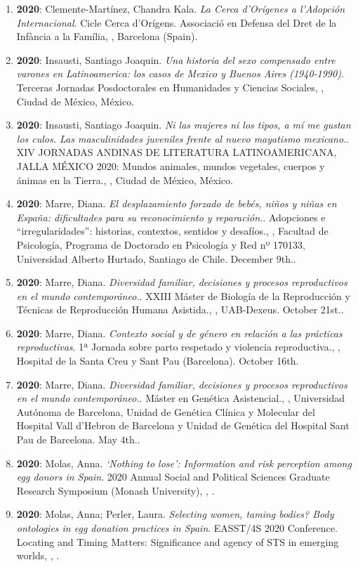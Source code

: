 \begin{enumerate}
\item {\bf 2020}: Clemente-Martínez, Chandra Kala. {\it La Cerca d’Orígenes a l’Adopción Internacional}. Cicle Cerca d’Orígens. Associació en Defensa del Dret de la Infància a la Família, , Barcelona (Spain).\filbreak
\item {\bf 2020}: Insausti, Santiago Joaquin. {\it Una historia del sexo compensado entre varones en Latinoamerica: los casos de Mexico y Buenos Aires (1940-1990)}. Terceras Jornadas Posdoctorales en Humanidades y Ciencias Sociales, , Ciudad de México, México.\filbreak
\item {\bf 2020}: Insausti, Santiago Joaquin. {\it Ni las mujeres ni los tipos, a mí me gustan los culos. Las masculinidades juveniles frente al nuevo mayatismo mexicano.}. XIV JORNADAS ANDINAS DE LITERATURA LATINOAMERICANA, JALLA MÉXICO 2020: Mundos animales, mundos vegetales, cuerpos y ánimas en la Tierra., , Ciudad de México, México.\filbreak
\item {\bf 2020}: Marre, Diana. {\it El desplazamiento forzado de bebés, niños y niñas en España: dificultades para su reconocimiento y reparación.}. Adopciones e “irregularidades”: historias, contextos, sentidos y desafíos., , Facultad de Psicología, Programa de Doctorado en Psicología y Red nº 170133, Universidad Alberto Hurtado, Santiago de Chile. December 9th..\filbreak
\item {\bf 2020}: Marre, Diana. {\it Diversidad familiar, decisiones y procesos reproductivos en el mundo contemporáneo.}. XXIII Máster de Biología de la Reproducción y Técnicas de Reproducción Humana Asistida., , UAB-Dexeus. October 21st..\filbreak
\item {\bf 2020}: Marre, Diana. {\it Contexto social y de género en relación a las prácticas reproductivas}. 1ª Jornada sobre parto respetado y violencia reproductiva., , Hospital de la Santa Creu y Sant Pau (Barcelona). October 16th.\filbreak
\item {\bf 2020}: Marre, Diana. {\it Diversidad familiar, decisiones y procesos reproductivos en el mundo contemporáneo.}. Máster en Genética Asistencial., , Universidad Autónoma de Barcelona, Unidad de Genética Clínica y Molecular del Hospital Vall d’Hebron de Barcelona y Unidad de Genética del Hospital Sant Pau de Barcelona. May 4th..\filbreak
\item {\bf 2020}: Molas, Anna. {\it ‘Nothing to lose’: Information and risk perception  among egg donors in Spain}. 2020 Annual Social and Political Sciences Graduate Research Symposium (Monash University), , .\filbreak
\item {\bf 2020}: Molas, Anna; Perler, Laura. {\it Selecting women, taming bodies? Body ontologies in egg donation practices in Spain}. EASST/4S 2020 Conference. Locating and Timing Matters: Significance and agency of STS in emerging worlds, , .\filbreak

\end{enumerate}
